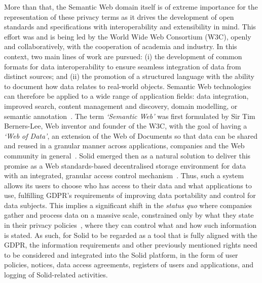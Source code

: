 More than that, the Semantic Web domain itself is of extreme importance for the representation of these privacy terms as it drives the development of open standards and specifications with interoperability and extensibility in mind.
This effort was and is being led by the World Wide Web Consortium (W3C), openly and collaboratively, with the cooperation of academia and industry.
In this context, two main lines of work are pursued:
(i) the development of common formats for data interoperability to ensure seamless integration of data from distinct sources; and 
(ii) the promotion of a structured language with the ability to document how data relates to real-world objects.
Semantic Web technologies can therefore be applied to a wide range of application fields: data integration, improved search, content management and discovery, domain modelling, or semantic annotation~\citeyearpar{noauthor_semantic_2012}.
The term \textit{`Semantic Web'} was first formulated by Sir Tim Berners-Lee, Web inventor and founder of the W3C, with the goal of having a \textit{`Web of Data'}, an extension of the Web of Documents so that data can be shared and reused in a granular manner across applications, companies and the Web community in general~\citep{berners-lee_semantic_2001}.
Solid emerged then as a natural solution to deliver this promise as a Web standards-based decentralised storage environment for data with an integrated, granular access control mechanism~\citep{sambra_solid_2016,verborgh_re-decentralizing_2022}.
Thus, such a system allows its users to choose who has access to their data and what applications to use, fulfilling GDPR's requirements of improving data portability and control for data subjects.
This implies a significant shift in the \textit{status quo} where companies gather and process data on a massive scale, constrained only by what they state in their privacy policies~\citep{nixdorf_planting_2019,robertson_excessive_2020}, where they can control what and how such information is stated.
As such, for Solid to be regarded as a tool that is fully aligned with the GDPR, the information requirements and other previously mentioned rights need to be considered and integrated into the Solid platform, in the form of user policies, notices, data access agreements, registers of users and applications, and logging of Solid-related activities.